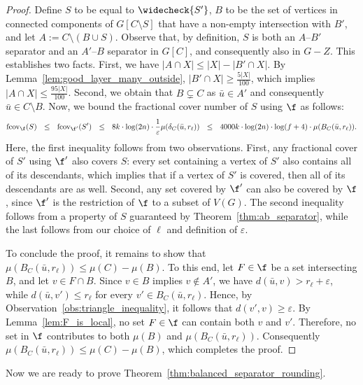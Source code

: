 \begin{proof}
    Define $S$ to be equal to $\widecheck{S'}$, $B$ to be the set of vertices in connected components of $G[C \setminus S]$ that have a non-empty intersection with $B'$, and let $A := C \setminus (B \cup S)$. Observe that, by definition, $S$ is both an $A$--$B'$ separator and an $A'$--$B$ separator in $G[C]$, and consequently also in $G - Z$. This establishes two facts. First, we have $|A \cap X| \le |X| - |B' \cap X|$. By Lemma~\ref{lem:good_layer_many_outside}, $|B' \cap X| \ge \tfrac{5|X|}{100}$, which implies $|A \cap X| \le \tfrac{95|X|}{100}$. Second, we obtain that $B \subsetneq C$ as $\bar{u}\in A'$ and consequently $\bar{u}\in C\setminus B$.
    Now, we bound the fractional cover number of $S$ using $\f$ as follows:
    $$
    \mathrm{fcov}_{\f}(S)
    \ \ \leq \ \ \mathrm{fcov}_{\f'}(S')
    \ \ \leq \ \ 8k \cdot \log(2n) \cdot \frac{1}{\varepsilon} \mu(\delta_C(\Bar{u}, r_\ell)) 
    \ \ \leq \ \ 4000k \cdot \log(2n) \cdot \log (f + 4) \cdot \mu(B_C(\Bar{u}, r_\ell)).
    $$
    Here, the first inequality follows from two observations. First, any fractional cover of $S'$ using $\f'$ also covers $S$: every set containing a vertex of $S'$ also contains all of its descendants, which implies that if a vertex of $S'$ is covered, then all of its descendants are as well. Second, any set covered by $\f'$ can also be covered by $\f$, since $\f'$ is the restriction of $\f$ to a subset of $V(G)$. The second inequality follows from a property of $S$ guaranteed by Theorem~\ref{thm:ab_separator}, while the last follows from our choice of $\ell$ and definition of $\varepsilon$.
    
    To conclude the proof, it remains to show that $\mu(B_C(\bar{u}, r_\ell)) \le \mu(C) - \mu(B)$. To this end, let $F \in \f$ be a set intersecting $B$, and let $v \in F \cap B$. Since $v \in B$ implies $v \notin A'$, we have $d(\bar{u}, v) > r_\ell + \varepsilon$, while $d(\bar{u}, v') \le r_\ell$ for every $v' \in B_C(\bar{u}, r_\ell)$. Hence, by Observation~\ref{obs:triangle_inequality}, it follows that $d(v', v) \ge \varepsilon$. By Lemma~\ref{lem:F_is_local}, no set $F \in \f$ can contain both $v$ and $v'$. Therefore, no set in $\f$ contributes to both $\mu(B)$ and $\mu(B_C(\bar{u}, r_\ell))$. Consequently $\mu(B_C(\bar{u}, r_\ell)) \le \mu(C) - \mu(B)$, which completes the proof.
\end{proof}

Now we are ready to prove Theorem~\ref{thm:balanced_separator_rounding}.


